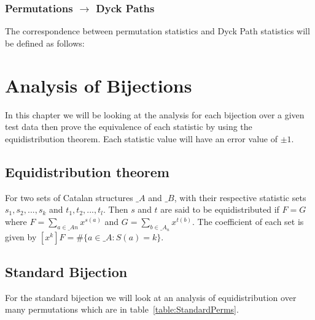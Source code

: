 \documentclass[12pt]{article}
\begin{document}
\subsubsection{Permutations $\rightarrow$ Dyck Paths}
The correspondence between permutation statistics and Dyck Path statistics will be defined as follows:


\section{Analysis of Bijections}
In this chapter we will be looking at the analysis for each bijection over a given test data then prove the equivalence of each statistic by using the equidistribution theorem. Each statistic value will have an error value of $\pm 1$.

\subsection{Equidistribution theorem}
For two sets of Catalan structures $\mathcal_{A}$ and $\mathcal_{B}$, with their respective statistic sets $s_1, s_2,..., s_k$ and $t_1, t_2,...,t_l$. Then $s$ and $t$ are said to be equidistributed if $F = G$ where $F = {\sum_{a \in {\mathcal_{A}}n}} x^{s(a)}$ and $G = {\sum_{b \in {\mathcal_{A}}_n}} x^{t(b)}$. The coefficient of each set is given by $[x^k]F = \#\{a \in {\mathcal_{A}} : S(a) = k\}$.

\subsection{Standard Bijection}
For the standard bijection we will look at an analysis of equidistribution over many permutations which are in table~\ref{table:StandardPerms}. 
\end{document}
